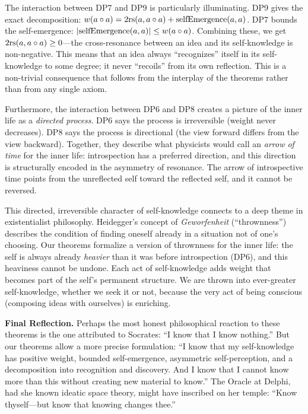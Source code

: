 The interaction between DP7 and DP9 is particularly illuminating.
DP9 gives the exact decomposition: $w(a \circ a) = 2\mathrm{rs}(a,
a \circ a) + \mathrm{selfEmergence}(a,a)$. DP7 bounds the
self-emergence: $|\mathrm{selfEmergence}(a,a)| \leq w(a \circ a)$.
Combining these, we get $2\mathrm{rs}(a, a \circ a) \geq 0$---the
cross-resonance between an idea and its self-knowledge is
non-negative. This means that an idea always ``recognizes'' itself
in its self-knowledge to some degree; it never ``recoils'' from its
own reflection. This is a non-trivial consequence that follows from
the interplay of the theorems rather than from any single axiom.

Furthermore, the interaction between DP6 and DP8 creates a picture
of the inner life as a \emph{directed process}. DP6 says the process
is irreversible (weight never decreases). DP8 says the process is
directional (the view forward differs from the view backward). Together,
they describe what physicists would call an \emph{arrow of time} for
the inner life: introspection has a preferred direction, and this
direction is structurally encoded in the asymmetry of resonance. The
arrow of introspective time points from the unreflected self toward the
reflected self, and it cannot be reversed.

This directed, irreversible character of self-knowledge connects to a
deep theme in existentialist philosophy. Heidegger's concept of
\emph{Geworfenheit} (``thrownness'') describes the condition of finding
oneself already in a situation not of one's choosing. Our theorems
formalize a version of thrownness for the inner life: the self is
always already \emph{heavier} than it was before introspection
(DP6), and this heaviness cannot be undone. Each act of self-knowledge
adds weight that becomes part of the self's permanent structure. We
are thrown into ever-greater self-knowledge, whether we seek it or not,
because the very act of being conscious (composing ideas with
ourselves) is enriching.

\begin{reflectionbox}
\textbf{Final Reflection.}
Perhaps the most honest philosophical reaction to these theorems is the
one attributed to Socrates: ``I know that I know nothing.'' But our
theorems allow a more precise formulation: ``I know that my
self-knowledge has positive weight, bounded self-emergence, asymmetric
self-perception, and a decomposition into recognition and discovery.
And I know that I cannot know more than this without creating new
material to know.'' The Oracle at Delphi, had she known ideatic space
theory, might have inscribed on her temple: ``Know thyself---but know
that knowing changes thee.''
\end{reflectionbox}


